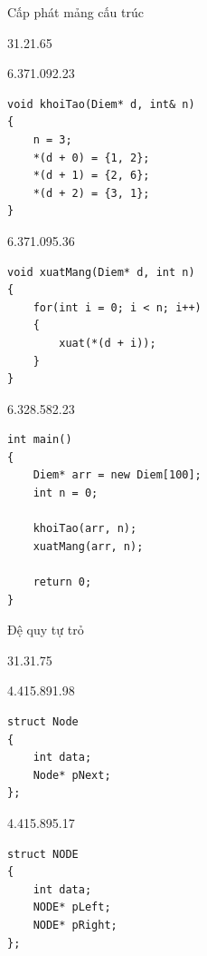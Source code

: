 \begin{frame}[fragile]{Cấp phát mảng cấu trúc}
\begin{blk}{3}{1.2}{1.65}\end{blk}
\begin{blk}{6.37}{1.09}{2.23}
\begin{lstlisting}[basicstyle=\cf{9.7}]
void khoiTao(Diem* d, int& n)
{
    n = 3;
    *(d + 0) = {1, 2};
    *(d + 1) = {2, 6};
    *(d + 2) = {3, 1};
}
\end{lstlisting}
\end{blk}
\begin{blk}{6.37}{1.09}{5.36}
\begin{lstlisting}[basicstyle=\cf{9.7}]
void xuatMang(Diem* d, int n)
{
    for(int i = 0; i < n; i++)
    {
        xuat(*(d + i));
    }
}
\end{lstlisting}
\end{blk}
\begin{blk}{6.32}{8.58}{2.23}
\begin{lstlisting}[basicstyle=\cf{9.6}]
int main()
{
    Diem* arr = new Diem[100];
    int n = 0;

    khoiTao(arr, n);
    xuatMang(arr, n);

    return 0;
}
\end{lstlisting}
\end{blk}
\end{frame}

\begin{frame}[fragile]{Đệ quy tự trỏ}
\begin{blk}{3}{1.3}{1.75}\end{blk}
\begin{blk}{4.41}{5.89}{1.98}
\begin{lstlisting}[basicstyle=\cf{11.6}]
struct Node
{
    int data;
    Node* pNext;
};
\end{lstlisting}
\end{blk}
\begin{blk}{4.41}{5.89}{5.17}
\begin{lstlisting}[basicstyle=\cf{11.6}]
struct NODE
{
    int data;
    NODE* pLeft;
    NODE* pRight;
};
\end{lstlisting}
\end{blk}
\end{frame}

